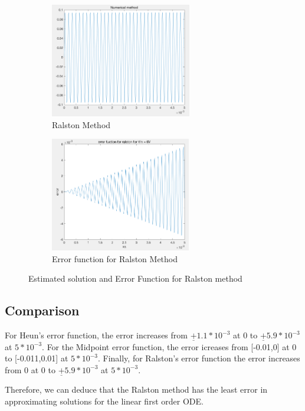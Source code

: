 \documentclass[11pt,a4paper]{article}
\begin{document}
\begin{figure}[h]
\begin{subfigure}{.5\textwidth}
  \includegraphics[width=.9\linewidth,height = 5cm
  ]{Ex2_Figs/ralston_error_numerical_method}
  \caption[right]{Ralston Method}
  \label{fig:ralston_method}
\end{subfigure}
\begin{subfigure}{.5\textwidth}
  \includegraphics[width=.9\linewidth,height = 5cm]{Ex2_Figs/ralston_error}
  \caption{Error function for Ralston Method}
  \label{fig:ralston_error}
\end{subfigure}
\caption{Estimated solution and Error Function for Ralston method}
\label{fig:Ralston_Error_sub}
\end{figure}



\clearpage

\subsection{Comparison}
For Heun's error function, the error increases from
$\underline{+}1.1*10^{-3}$ at 0 to $\underline{+}5.9*10^{-3}$ at $5*10^{-3}$. For the Midpoint error function, the error icreases from [-0.01,0] at 0 to [-0.011,0.01] at $5*10^{-3}$.
Finally, for Ralston's error function the error increases from 0 at 0 to $\underline{+}5.9*10^{-3}$ at $5*10^{-3}$.

Therefore, we can deduce that the Ralston method has the least error in approximating solutions for the linear first order ODE. %
\end{document}

